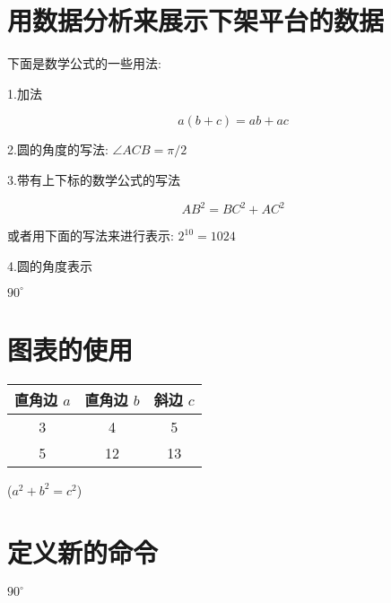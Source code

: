 \documentclass[UTF8]{ctexart}
\begin{document}
\section{用数据分析来展示下架平台的数据}

下面是数学公式的一些用法:

1.加法

\begin{equation}
a(b+c) = ab + ac
\end{equation}

2.圆的角度的写法: $\angle ACB = \pi/2$

3.带有上下标的数学公式的写法

\begin{equation}
AB^2 = BC^2 + AC^2
\end{equation}

或者用下面的写法来进行表示: $2^{10} = 1024$

4.圆的角度表示

$90^\circ$

\section{图表的使用}


\begin{table}[h]
\begin{tabular}{|ccc|} %
\hline %
直角边 $a$ & 直角边 $b$ & 斜边 $c$\\ %
\hline
3 & 4 & 5 \\
5 & 12 & 13 \\
\hline
\end{tabular}%
\qquad %
($a^2 + b^2 = c^2$)
\end{table}

\section{定义新的命令}

\newcommand\degree{^\circ}
$90\degree$

\end{document}
